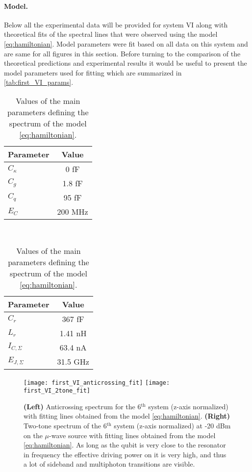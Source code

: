 \documentclass[12pt, twoside]{report}
\numberwithin{equation}{section}
\begin{document}
\paragraph{Model.} Below all the experimental data will be provided for system VI along with theoretical fits of the spectral lines that were observed using the model \eqref{eq:hamiltonian}. Model parameters were fit based on all data on this system and are same for all figures in this section. Before turning to the comparison of the theoretical predictions and experimental results it would be useful to present the model parameters used for fitting which are summarized in \autoref{tab:first_VI_params}.

\begin{table}[h]
\centering
\begin{tabular}{l|c}
Parameter & Value \\
\hline 
$C_\kappa$ & 0 fF \\
\hline
$C_g$ & 1.8 fF \\
\hline
$C_q$ & 95 fF \\
\hline
$E_C$ & 200 MHz
\end{tabular}~
\begin{tabular}{l|c}
Parameter & Value\\
\hline
$C_r$ & 367 fF \\
\hline
$L_r$ & 1.41 nH \\
\hline
$I_{C, \Sigma}$ & 63.4 nA \\
\hline
$E_{J, \Sigma}$ & 31.5 GHz
\end{tabular}
\caption{Values of the main parameters defining the spectrum of the model \eqref{eq:hamiltonian}.}
\label{tab:first_VI_params}
\end{table}

\begin{figure}[t]
\centering
\texttt{[image: first\_VI\_anticrossing\_fit]} \texttt{[image: first\_VI\_2tone\_fit]}

\caption{\textbf{(Left)} Anticrossing spectrum for the 6$^\text{th}$ system (z-axis normalized) with fitting lines obtained from the model \eqref{eq:hamiltonian}. \textbf{(Right)} Two-tone spectrum of the 6$^\text{th}$ system (z-axis normalized) at -20 dBm on the $\mu$-wave source with fitting lines obtained from the model \eqref{eq:hamiltonian}. As long as the qubit is very close to the resonator in frequency the effective driving power on it is very high, and thus a lot of sideband and multiphoton transitions are visible.}
\label{fig:first_VI_spectroscopy}
\end{figure}
\end{document}
